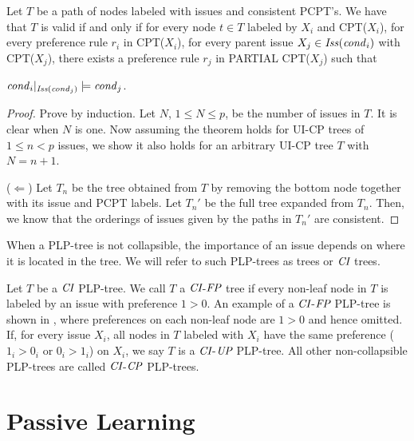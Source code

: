 \begin{thm}
\label{thm:valid}
	Let $T$ be a path of nodes labeled with issues and consistent PCPT's.
	We have that $T$ is valid if and only if
	for every node $t \in T$ labeled by $X_i$ and CPT($X_i$),
	for every preference rule $r_i$ in CPT($X_i$),
	for every parent issue $X_j \in \mathit{Iss}(\mathit{cond}_i)$ with CPT($X_j$),
	there exists a preference rule $r_j$ in PARTIAL CPT($X_j$)
	such that 
	\begin{center}
		$\mathit{cond}_i|_{\mathit{Iss}(\mathit{cond}_j)} \models \mathit{cond}_j$.
	\end{center}
\end{thm}
\begin{proof}
Prove by induction. Let $N$, $1\leq N\leq p$, be the number of issues in $T$.
It is clear when $N$ is one.  Now assuming the theorem holds for UI-CP trees of $1\leq n < p$
issues, we show it also holds for an arbitrary UI-CP tree $T$ with $N=n+1$.

($\Leftarrow$) Let $T_n$ be the tree obtained from $T$ by removing the bottom node together
with its issue and PCPT labels.
Let $T_n'$ be the full tree expanded from $T_n$.  Then, we know that the orderings of issues
given by the paths in $T_n'$ are consistent.
\end{proof}
 
When a PLP-tree is not collapsible, the importance of an issue depends
on where it is located in the tree. We will refer to such PLP-trees as
 trees or $\textit{CI}$ trees.

Let $T$ be a $\textit{CI}$ PLP-tree.
We call $T$ a $\textit{CI}$-$\textit{FP}$ tree if every non-leaf node in $T$
is labeled by an issue with preference $1>0$.
An example of a $\textit{CI}$-$\textit{FP}$ PLP-tree is shown in , where
preferences on each non-leaf node are $1>0$ and hence omitted.
If, for every issue $X_i$, all nodes in $T$ labeled with $X_i$
have the same preference ($1_i>0_i$ or $0_i>1_i$) on $X_i$, we say $T$ is
a $\textit{CI}$-$\textit{UP}$ PLP-tree.  
All other non-collapsible PLP-trees are called $\textit{CI}$-$\textit{CP}$ PLP-trees.


\section{Passive Learning}

